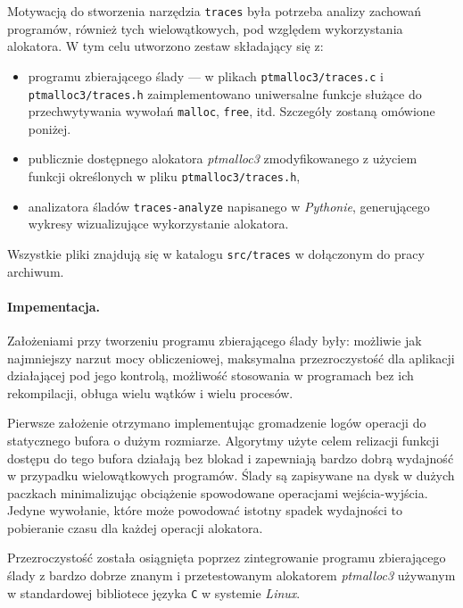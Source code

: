 \documentclass[12pt,a4paper,titlepage,twoside]{mwart}
\begin{document}
Motywacją do stworzenia narzędzia \texttt{traces} była potrzeba analizy
zachowań programów, również tych wielowątkowych, pod względem wykorzystania
alokatora. W tym celu utworzono zestaw składający się z:
\begin{itemize}
\item programu zbierającego ślady --- w plikach \texttt{ptmalloc3/traces.c} i
\texttt{ptmalloc3/traces.h} zaimplementowano uniwersalne funkcje służące
do przechwytywania wywołań \texttt{malloc}, \texttt{free}, itd. Szczegóły
zostaną omówione poniżej.
\item publicznie dostępnego alokatora \textit{ptmalloc3} zmodyfikowanego z
użyciem funkcji określonych w pliku \texttt{ptmalloc3/traces.h},
\item analizatora śladów \texttt{traces-analyze} napisanego w
\textit{Pythonie}, generującego wykresy wizualizujące wykorzystanie alokatora.
\end{itemize}
Wszystkie pliki znajdują się w katalogu \texttt{src/traces} w dołączonym do
pracy archiwum.

\paragraph{Impementacja.} Założeniami przy tworzeniu programu zbierającego ślady
były: możliwie jak najmniejszy narzut mocy obliczeniowej, maksymalna
przezroczystość dla aplikacji działającej pod jego kontrolą, możliwość
stosowania w programach bez ich rekompilacji, obługa wielu wątków i wielu
procesów.

Pierwsze założenie otrzymano implementując gromadzenie logów operacji do
statycznego bufora o dużym rozmiarze. Algorytmy użyte celem relizacji funkcji
dostępu do tego bufora działają bez blokad i zapewniają bardzo dobrą wydajność
w przypadku wielowątkowych programów. Ślady są zapisywane na dysk w dużych
paczkach minimalizując obciążenie spowodowane operacjami wejścia-wyjścia.
Jedyne wywołanie, które może powodować istotny spadek wydajności to pobieranie
czasu dla każdej operacji alokatora.

Przezroczystość została osiągnięta poprzez zintegrowanie programu zbierającego
ślady z bardzo dobrze znanym i przetestowanym alokatorem \textit{ptmalloc3}
używanym w standardowej bibliotece języka \verb+C+ w systemie \textit{Linux}.
\end{document}
